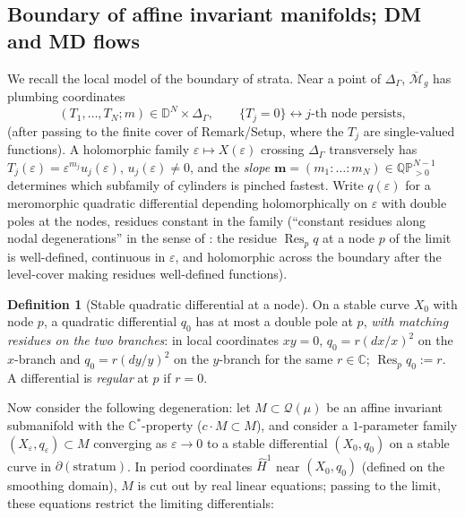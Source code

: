 \documentclass[11pt]{article}
\newcommand{\C}{\mathbb{C}}
\newcommand{\D}{\mathbb{D}}
\newcommand{\cQ}{\mathcal{Q}}
\newcommand{\M}{\mathcal{M}}
\DeclareMathOperator{\Res}{Res}
\theoremstyle{definition}
\newtheorem{defn}[thm]{Definition}
\theoremstyle{remark}
\begin{document}
\subsection{Boundary of affine invariant manifolds; DM and MD flows}

We recall the local model of the boundary of strata. Near a point of
$\Delta_\Gamma$, $\overline{\M}_{g}$ has plumbing coordinates
\[
(T_1,\dots,T_N; m) \in \D^N \times \Delta_\Gamma, \qquad
\{T_j = 0\} \leftrightarrow \text{$j$-th node persists},
\]
(after passing to the finite cover of Remark/Setup, where the $T_j$ are
single-valued functions). A holomorphic family
$\varepsilon \mapsto X(\varepsilon)$ crossing $\Delta_\Gamma$ transversely
has $T_j(\varepsilon) = \varepsilon^{m_j} u_j(\varepsilon)$,
$u_j(\varepsilon) \neq 0$, and the \emph{slope}
$\mathbf{m} = (m_1 : \dots : m_N) \in \mathbb{QP}^{N-1}_{>0}$ determines
which subfamily of cylinders is pinched fastest. Write
$q(\varepsilon)$ for a meromorphic quadratic differential depending
holomorphically on $\varepsilon$ with double poles at the nodes, residues
constant in the family (``constant residues along nodal degenerations'' in
the sense of \cite{MW}: the residue $\Res_p q$ at a node $p$ of the limit
is well-defined, continuous in $\varepsilon$, and holomorphic across the
boundary after the level-cover making residues well-defined functions).

\begin{defn}[Stable quadratic differential at a node]
On a stable curve $X_0$ with node $p$, a quadratic differential $q_0$ has at
most a double pole at $p$, \emph{with matching residues on the two
branches}: in local coordinates $xy = 0$, $q_0 = r (dx/x)^2$ on the
$x$-branch and $q_0 = r(dy/y)^2$ on the $y$-branch for the same
$r \in \C$; $\Res_p q_0 := r$. A differential is \emph{regular} at $p$ if
$r = 0$.
\end{defn}

Now consider the following degeneration: let $M \subset \cQ(\mu)$ be an
affine invariant submanifold with the $\C^*$-property
($c \cdot M \subset M$), and consider a $1$-parameter family
$(X_\varepsilon, q_\varepsilon) \subset M$ converging as
$\varepsilon \to 0$ to a stable differential $(X_0, q_0)$ on a stable curve
in $\partial (\text{stratum})$. In period coordinates $\widehat H^1$
near $(X_0,q_0)$ (defined on the smoothing domain), $M$ is cut out by real
linear equations; passing to the limit, these equations restrict the
limiting differentials:
\end{document}
